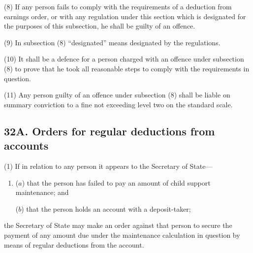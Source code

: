 \documentclass[12pt,a4paper]{article}
\begin{document}
(8)
If any person fails to comply with the requirements of a deduction from earnings order, or with any regulation under this section which is designated for the purposes of this subsection, he shall be guilty of an offence.

(9) In subsection (8) “designated” means designated by the regulations.

(10)
It shall be a defence for a person charged with an offence under subsection (8) to prove that he took all reasonable steps to comply with the requirements in question.

(11)
Any person guilty of an offence under subsection (8) shall be liable on summary conviction to a fine not exceeding level two on the standard scale.


\subsection{32A. Orders for regular deductions from accounts}

(1) If in relation to any person it appears to the Secretary of State---
\begin{enumerate}\item[]
($a$) that the person has failed to pay an amount of child support maintenance;
and

($b$) that the person holds an account with a deposit-taker;
\end{enumerate}
the Secretary of State may make an order against that person to secure the payment of any amount due under the maintenance calculation in question by means of regular deductions from the account.
\end{document}
